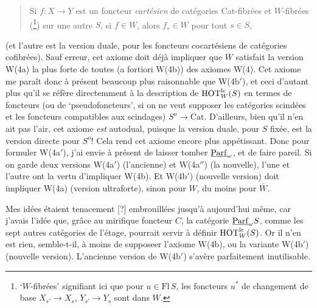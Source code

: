 \begin{quote}
Si $f : X \longrightarrow Y$ est un foncteur \textit{cartésien} de catégories Cat-fibrées et $W$-fibrées (\footnote{‘$W$-fibrées’ signifiant ici que pour $u \in \mathrm{Fl}\,S$, les foncteurs $u^*$ de changement de base $X_{s'} \longrightarrow X_s$, $Y_{s'} \longrightarrow Y_s$ sont dans $W$.}) sur une autre $S$, si $f \in W$, alors $f_s \in W$ pour tout $s \in S$,
\end{quote}

(et l'autre est la version duale, pour les foncteurs cocartésiens de catégories cofibrées). Sauf erreur, cet axiome doit déjà impliquer que $\overline{W}$ satisfait la version W(4a) la plus forte
de toutes (a fortiori W(4b)) des axiomes W(4). Cet axiome me paraît donc à présent beaucoup plus raisonnable que W(4b$'$), et ceci d'autant plus qu'il se réfère directemment à la description de $\mathrm{HOT}^{\mathrm{lc}}_W(S)$ en termes de foncteurs (ou de ‘pseudofoncteurs’, si on ne veut supposer les catégories scindées et les foncteurs compatibles aux scindages) $S^{o} \longrightarrow \mathrm{Cat}$. %
D'ailleurs, bien qu'il n'en ait pas l'air, cet axiome \textit{est} autodual, puisque la version duale, pour $S$ fixée, est la version directe pour $S^{o}$! Cela rend cet axiome encore plus appétissant. Donc pour formuler W(4a$'$), j'ai envie à présent de laisser tomber $\underline{\mathrm{Parf}}_\omega$, et de faire pareil. Si on garde deux versions W(4a$'$) (l'ancienne) et W(4a$''$) (la nouvelle), l'une et l'autre ont la vertu d'impliquer W(4b). Et W(4b$'$) (nouvelle version) doit impliquer W(4a) (version ultraforte), sinon pour $W$, du moins pour $\overline{W}$.

Mes idées étaient tenacement [?] embrouillées
jusqu'à aujourd'hui même, car j'avais l'idée que, grâce au mirifique foncteur $C$, la catégorie $\underline{\mathrm{Parf}}_\omega S$, comme les sept autres catégories de l'étage, pourrait servir à définir $\mathrm{HOT}^{\mathrm{lc}}_W(S)$. Or il n'en est rien, semble-t-il, à moins de supposeer l'axiome W(4b), ou la variante W(4b$'$) (nouvelle version). L'ancienne version de W(4b$'$) s'avère parfaitement inutilisable. %

